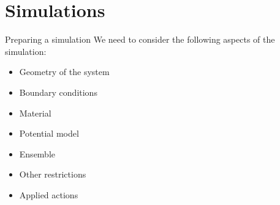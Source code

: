 \documentclass{beamer}
\begin{document}
\section{Simulations}
\begin{frame}{Preparing a simulation}
	We need to consider the following aspects of the simulation:
	\begin{itemize}
		\item Geometry of the system
		\item Boundary conditions
		\item Material
		\item Potential model
		\item Ensemble
		\item Other restrictions
		\item Applied actions
	\end{itemize}
	
\end{frame}
\end{document}
